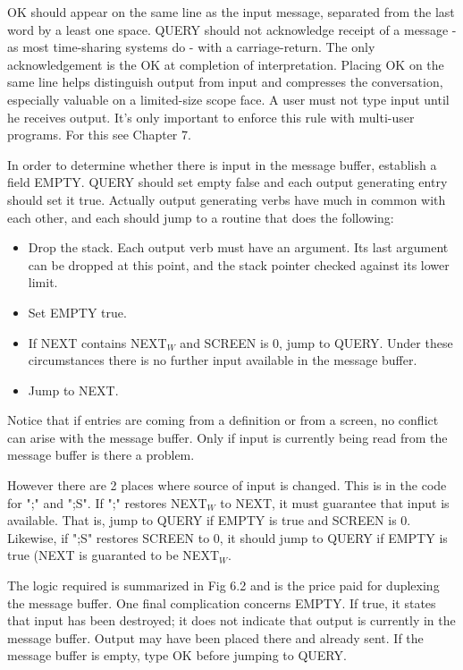 \documentclass[b5paper, oneside]{book}
\begin{document}
OK should appear on the same line as the input message, separated from the last word by a least one space. QUERY should not acknowledge receipt of a message - as most time-sharing systems do - with a carriage-return. The only acknowledgement is the OK at completion of interpretation. Placing OK on the same line helps distinguish output from input and compresses the conversation, especially valuable on a limited-size scope face. A user must not type input until he receives output. It's only important to enforce this rule with multi-user programs. For this see Chapter 7.

In order to determine whether there is input in the message buffer, establish a field EMPTY. QUERY should set empty false and each output generating entry should set it true. Actually output generating verbs have much in common with each other, and each should jump to a routine that does the following:\begin{itemize}
   \item Drop the stack. Each output verb must have an argument. Its last argument can be dropped at this point, and the stack pointer checked against its lower limit.
   \item Set EMPTY true.
   \item If NEXT contains NEXT$_W$ and SCREEN is 0, jump to QUERY. Under these circumstances there is no further input available in the message buffer.
   \item Jump to NEXT.\end{itemize}
Notice that if entries are coming from a definition or from a screen, no conflict can arise with the message buffer. Only if input is currently being read from the message buffer is there a problem.

However there are 2 places where source of input is changed. This is in the code for ";" and ";S". If ";" restores NEXT$_W$ to NEXT, it must guarantee that input is available. That is, jump to QUERY if EMPTY is true and SCREEN is 0. Likewise, if ";S" restores SCREEN to 0, it should jump to QUERY if EMPTY is true (NEXT is guaranted to be NEXT$_W$.

The logic required is summarized in Fig 6.2 and is the price paid for duplexing the message buffer. One final complication concerns EMPTY. If true, it states that input has been destroyed; it does not indicate that output is currently in the message buffer. Output may have been placed there and already sent. If the message buffer is empty, type OK before jumping to QUERY.
\end{document}
